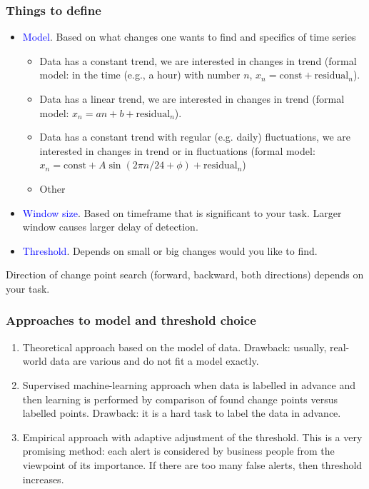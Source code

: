 \documentclass[intlimits, 9pt, unicode]{beamer}
\newcommand{\textblue}[1]{\textcolor{blue}{#1}}
\begin{document}
\begin{frame}
    \frametitle{Things to define}
	
	\begin{itemize}
	    	\item \textblue{Model}. Based on what changes one wants  to find and specifics of time series
			\begin{itemize}
			\item Data has a constant trend, we are interested in changes in trend (formal model: in the time (e.g., a hour) with number $n$, $x_n = \mathrm{const} + \mathrm{residual}_n$).
\smallskip
			\item Data has a linear trend, we are interested in changes in trend (formal model: $x_n = an+b + \mathrm{residual}_n$).
\smallskip
			\item Data has a constant trend with regular (e.g. daily) fluctuations, we are interested in changes in trend or in fluctuations (formal model: $x_n = \mathrm{const} + A\sin(2\pi n/24+\phi) + \mathrm{residual}_n$)
\smallskip			
            \item Other
			\end{itemize}
\medskip
		\item \textblue{Window size}. Based on timeframe that is significant to your task. Larger window causes larger delay of detection.
\medskip
		\item \textblue{Threshold}. Depends on small or big changes would you like to find.
	    \end{itemize}

\bigskip
		Direction of change point search (forward, backward, both directions) depends on your task.


 \end{frame}

\begin{frame}
    \frametitle{Approaches to model and threshold choice}

\begin{enumerate}
\item
Theoretical approach based on the model of data. Drawback: usually, real-world data are various and do not fit a model exactly.

\bigskip
\item
Supervised machine-learning approach when data is labelled in advance and then learning is performed by comparison of found change points versus labelled points. Drawback: it is a hard task to label the data in advance.

\bigskip
\item
Empirical approach with adaptive adjustment of the threshold. This is a very promising method:
each alert is considered by business people from the viewpoint of its
importance. If there are too many false alerts, then threshold increases.
\end{enumerate}
 \end{frame}
\end{document}
